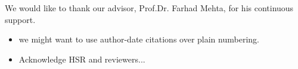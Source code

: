 
\begin{acknowledgements}
\addchaptertocentry{\acknowledgementname} %
We would like to thank our advisor, Prof.Dr. Farhad Mehta, for his continuous support.

\begin{itemize}
	\item we might want to use author-date citations over plain numbering.
	\item Acknowledge HSR and reviewers...
\end{itemize}
\end{acknowledgements}


\setcounter{tocdepth}{2}
\tableofcontents %




\mainmatter %

\pagestyle{thesis} %






\subsubsection*{} %
\label{lastpage} %

